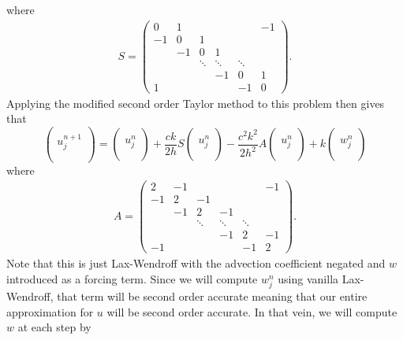 \documentclass{article}
\begin{document}
where 
\begin{align*}
	S = \begin{pmatrix}
		0  & 1 &&&& -1\\
		-1 & 0 & 1 \\
		& -1 & 0 & 1 & \\
		&&\ddots & \ddots & \ddots \\
		&&&-1 & 0 & 1 \\
		1 &&&& -1 & 0 \end{pmatrix}.
\end{align*}
Applying the modified second order Taylor method to this problem then gives that
\[
\begin{pmatrix}
	\\	u^{n+1}_j \\ \\
\end{pmatrix}=\begin{pmatrix}
\\	u^n_j \\ \\
\end{pmatrix}+\frac{ck}{2h}S\begin{pmatrix}
\\	u^n_j \\ \\
\end{pmatrix}-\frac{c^2k^2}{2h^2}A\begin{pmatrix}
\\	u^n_j \\ \\
\end{pmatrix}+k\begin{pmatrix}
	\\	w_j^n \\ \\
\end{pmatrix}
\] 
where 
\begin{align*}
	A = \begin{pmatrix}
		2  & -1 &&&& -1\\
		-1 & 2 & -1 \\
		& -1 & 2 & -1 & \\
		&&\ddots & \ddots & \ddots \\
		&&&-1 & 2 & -1 \\
		-1 &&&& -1 & 2 \end{pmatrix}.
\end{align*}
Note that this is just Lax-Wendroff with the advection coefficient negated and $w$ introduced as a forcing term. Since we will compute $w_j^n$ using vanilla Lax-Wendroff, that term will be second order accurate meaning that our entire approximation for $u$ will be second order accurate. In that vein, we will compute $w$ at each step by
\end{document}
